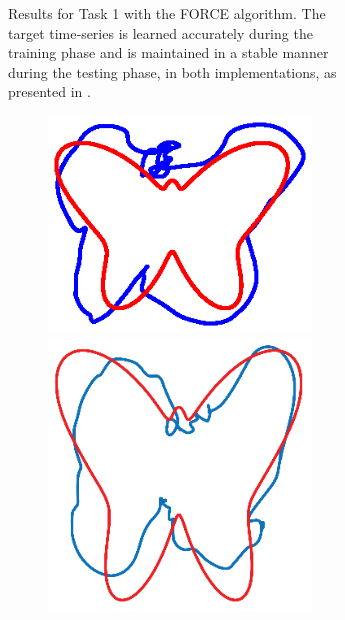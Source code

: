 \begin{figure}
\begin{subfigure}{\textwidth}
\begin{subfigure}{\textwidth}
        \end{subfigure}
        

    \caption{Results for Task 1 with the FORCE algorithm. The target time‐series is learned accurately during the training phase and is maintained in a stable manner during the testing phase, in both implementations, as presented in \cite{pyle2019}.}
    \label{Fig:compTask1FORCE}
    \end{subfigure}

    \begin{subfigure}{\textwidth}
        \centering
        
        \textbf{}\begin{subfigure}{\textwidth}
        \centering
        
        \includegraphics[trim=3cm 4cm 3cm 4cm, clip=true,height=.1\textheight]{Figures/Fig_T1/MATLAB/RHML_T1_Trajectory}
        \hspace{4em}
        \includegraphics[height=.08\textheight]{Figures/Fig_T1/Orig/RMHL_T1_Trajectory}

\end{subfigure}
\end{subfigure}
\end{figure}
